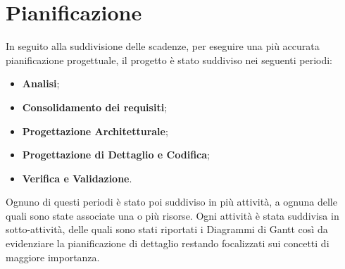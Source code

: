 \section{Pianificazione}
	In seguito alla suddivisione delle scadenze, per eseguire una più accurata pianificazione progettuale, il progetto è stato suddiviso nei seguenti periodi: \\
	\begin{itemize}
		\item \textbf{Analisi}; \\
		\item \textbf{Consolidamento dei requisiti}; \\
		\item \textbf{Progettazione Architetturale}; \\
		\item \textbf{Progettazione di Dettaglio e Codifica}; \\
		\item \textbf{Verifica e Validazione}. \\
	\end{itemize}
	Ognuno di questi periodi è stato poi suddiviso in più attività, a ognuna delle quali sono state associate una o più risorse. Ogni attività è stata suddivisa in sotto-attività, delle quali sono stati riportati i Diagrammi di Gantt così da evidenziare la pianificazione di dettaglio restando focalizzati sui concetti di maggiore importanza.
